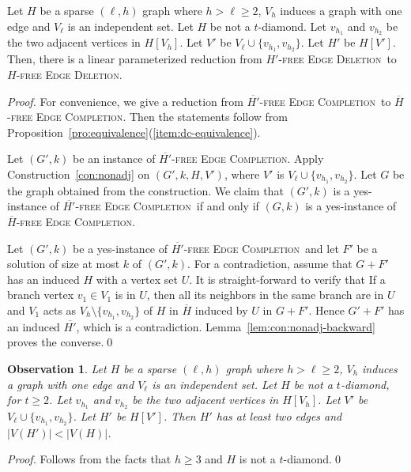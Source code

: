 \documentclass[envcountsame,envcountsect,10pt,oribibl]{llncs}
\newcommand{\pname}[1]{\textnormal{\textsc{#1}}}
\newcommand{\HED}{\pname{$H$-free Edge Deletion}}
\newcommand{\HDED}{\pname{$H'$-free Edge Deletion}}
\newcommand{\HBEC}{\pname{$\overline{H}$-free Edge Completion}}
\newcommand{\HDBEC}{\pname{$\overline{H'}$-free Edge Completion}}
\newtheorem{observation}[lemma]{Observation}
\begin{document}
\begin{lemma}
  \label{lem:vh1vl0}
  Let $H$ be a sparse $(\ell,h)$ graph where $h>\ell\geq 2$, $V_h$
  induces a graph with one edge and $V_{\ell}$ is an independent set.
  Let $H$ be not a $t$-diamond.
  Let $v_{h_1}$ and $v_{h_2}$ be the two adjacent vertices in $H[V_h]$.
  Let $V'$ be $V_{\ell}\cup \{v_{h_1},v_{h_2}\}$. Let $H'$ be $H[V']$. 
  Then, there is a linear
  parameterized reduction from \HDED\ to \HED.
\end{lemma}
\begin{proof}
  For convenience, we give a reduction from \HDBEC\ to \HBEC. Then the statements follow 
  from Proposition~\ref{pro:equivalence}(\ref{item:dc-equivalence}).

  Let $(G',k)$ be an instance of \HDBEC. Apply Construction~\ref{con:nonadj}
  on $(G',k,H,V')$, where $V'$ is $V_{\ell}\cup \{v_{h_1}, v_{h_2}\}$.
  Let $G$ be the graph obtained from the construction. We claim that 
  $(G',k)$ is a yes-instance of \HDBEC\ if and only if $(G,k)$ is a 
  yes-instance of \HBEC.

  Let $(G',k)$ be a yes-instance of \HDBEC\ and let $F'$ be a solution of size
  at most $k$ of $(G',k)$. For a contradiction, assume that $G+F'$ has an induced
  $H$ with a vertex set $U$. It is straight-forward to verify that 
  If a branch vertex $v_1\in V_1$ is in $U$, then all its neighbors in the same branch are in $U$ and
  $V_1$ acts as $V_h\setminus \{v_{h_1},v_{h_2}\}$ of $H$ in $\overline{H}$
  induced by $U$ in $G+F'$. Hence $G'+F'$ has an induced $\overline{H'}$, which is a contradiction.
  Lemma~\ref{lem:con:nonadj-backward} proves the converse.\qed  
\end{proof}

\begin{observation}
  \label{obs:vh1vl0}
  Let $H$ be a sparse $(\ell,h)$ graph where $h>\ell\geq 2$, $V_h$
  induces a graph with one edge and $V_{\ell}$ is an independent set.
  Let $H$ be not a $t$-diamond, for $t\geq 2$.
  Let $v_{h_1}$ and $v_{h_2}$ be the two adjacent vertices in $H[V_h]$.
  Let $V'$ be $V_{\ell}\cup \{v_{h_1},v_{h_2}\}$. Let $H'$ be $H[V']$. 
  Then $H'$ has at least two edges and $|V(H')| < |V(H)|$.
\end{observation}
\begin{proof}
  Follows from the facts that $h\geq 3$ and $H$ is not a $t$-diamond.\qed
\end{proof}
\end{document}
